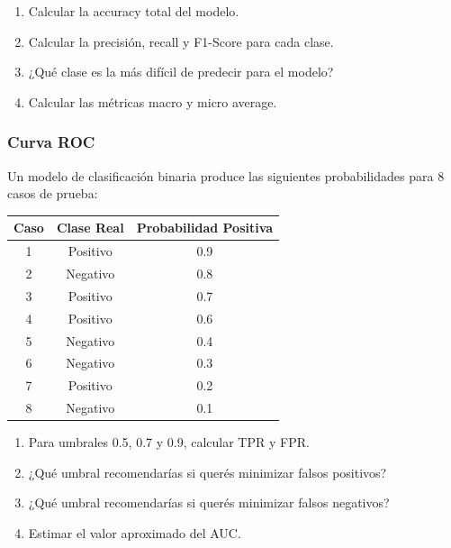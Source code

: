 \documentclass[12pt]{article}
\begin{document}
\begin{enumerate}
    \item[a.] Calcular la accuracy total del modelo.
    \item[b.] Calcular la precisión, recall y F1-Score para cada clase.
    \item[c.] ¿Qué clase es la más difícil de predecir para el modelo?
    \item[d.] Calcular las métricas macro y micro average.
\end{enumerate}

\subsubsection{Curva ROC}

Un modelo de clasificación binaria produce las siguientes probabilidades para 8 casos de prueba:

\begin{table}[H]
    \centering
    \begin{tabular}{|c|c|c|}
        \hline
        \textbf{Caso} & \textbf{Clase Real} & \textbf{Probabilidad Positiva} \\
        \hline
        1 & Positivo & 0.9 \\
        \hline
        2 & Negativo & 0.8 \\
        \hline
        3 & Positivo & 0.7 \\
        \hline
        4 & Positivo & 0.6 \\
        \hline
        5 & Negativo & 0.4 \\
        \hline
        6 & Negativo & 0.3 \\
        \hline
        7 & Positivo & 0.2 \\
        \hline
        8 & Negativo & 0.1 \\
        \hline
    \end{tabular}
\end{table}

\begin{enumerate}
    \item[a.] Para umbrales 0.5, 0.7 y 0.9, calcular TPR y FPR.
    \item[b.] ¿Qué umbral recomendarías si querés minimizar falsos positivos?
    \item[c.] ¿Qué umbral recomendarías si querés minimizar falsos negativos?
    \item[d.] Estimar el valor aproximado del AUC.
\end{enumerate}
\end{document}
